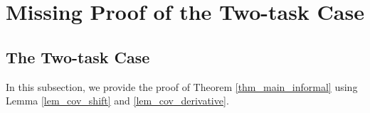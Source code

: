 \section{Missing Proof of the Two-task Case} \label{sec_maintools}



\subsection{The Two-task Case}\label{app_proof_main_thm}

In this subsection, we provide the proof of Theorem \ref{thm_main_informal} using Lemma  \ref{lem_cov_shift} and \ref{lem_cov_derivative}.

